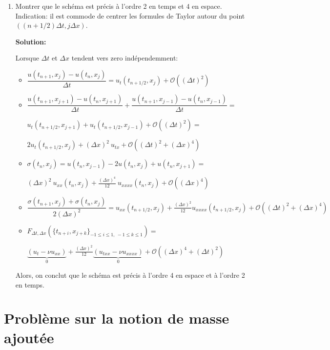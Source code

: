 \documentclass[10pt,a4paper,oneside]{article}
\begin{document}
\begin{enumerate}
\item
Montrer que le schéma est précis à l'ordre 2 en temps et 4 en espace. Indication: il est commode de centrer les formules de Taylor autour du point $((n + 1/2) \Delta t,j \Delta x)$.

\textbf{Solution:}

Lorsque $\Delta t$ et $\Delta x$ tendent vers zero indépendemment:

\begin{itemize}

\item
$\dfrac{u(t_{n + 1},x_j) - u(t_n,x_j)}{\Delta t} = u_t(t_{n + 1 / 2},x_j) + \mathcal{O}((\Delta t)^2)$

\item
$\dfrac{u(t_{n + 1},x_{j + 1}) - u(t_n,x_{j + 1})}{\Delta t} + \dfrac{u(t_{n + 1},x_{j - 1}) - u(t_n,x_{j - 1})}{\Delta t} =$

$u_t(t_{n + 1 / 2},x_{j + 1}) + u_t(t_{n + 1 / 2},x_{j - 1}) + \mathcal{O}((\Delta t)^2) =$

$2u_t(t_{n + 1 / 2},x_j) + (\Delta x)^2\ u_{tx} + \mathcal{O}((\Delta t)^2 + (\Delta x)^4)$

\item
$\sigma(t_n,x_j) = u(t_n,x_{j - 1}) - 2u(t_n,x_j) + u(t_n,x_{j + 1}) =$

$(\Delta x)^2\ u_{xx}(t_n,x_j) + \frac{(\Delta x)^4}{12}\ u_{xxxx}(t_n,x_j) + \mathcal{O}((\Delta x)^4)$

\item
$\dfrac{\sigma(t_{n + 1},x_j) + \sigma(t_n,x_j)}{2(\Delta x)^2} = u_{xx}(t_{n + 1/2},x_j) + \frac{(\Delta x)^2}{12}u_{xxxx}(t_{n + 1/2},x_j) + \mathcal{O}((\Delta t)^2 + (\Delta x)^4)$

\item
$F_{\Delta t, \Delta x}(\{ t_{n + i},x_{j + k} \}_{-1 \leq i \leq 1,\ -1 \leq k \leq 1}) =$

$\underbrace{(u_t - \nu u_{xx})}_{0} + \frac{(\Delta x)^2}{12}\underbrace{(u_{txx} - \nu u_{xxxx})}_{0} + \mathcal{O}((\Delta x)^4 + (\Delta t)^2)$

\end{itemize}

Alors, on conclut que le schéma est précis à l'ordre 4 en espace et à l'ordre 2 en temps.

\end{enumerate}

\section{Problème sur la notion de masse ajoutée}
\end{document}
